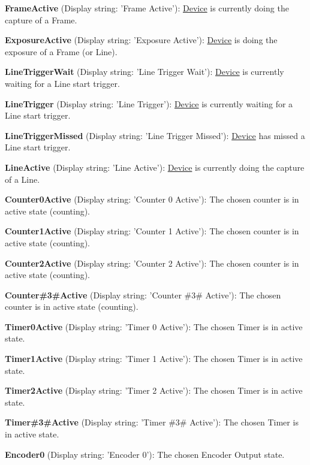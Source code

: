 \begin{DoxyItemize}
\item {\bfseries Frame\+Active} (Display string\+: 'Frame Active')\+: \hyperlink{classmv_i_m_p_a_c_t_1_1acquire_1_1_device}{Device} is currently doing the capture of a Frame.
\item {\bfseries Exposure\+Active} (Display string\+: 'Exposure Active')\+: \hyperlink{classmv_i_m_p_a_c_t_1_1acquire_1_1_device}{Device} is doing the exposure of a Frame (or Line).
\item {\bfseries Line\+Trigger\+Wait} (Display string\+: 'Line Trigger Wait')\+: \hyperlink{classmv_i_m_p_a_c_t_1_1acquire_1_1_device}{Device} is currently waiting for a Line start trigger.
\item {\bfseries Line\+Trigger} (Display string\+: 'Line Trigger')\+: \hyperlink{classmv_i_m_p_a_c_t_1_1acquire_1_1_device}{Device} is currently waiting for a Line start trigger.
\item {\bfseries Line\+Trigger\+Missed} (Display string\+: 'Line Trigger Missed')\+: \hyperlink{classmv_i_m_p_a_c_t_1_1acquire_1_1_device}{Device} has missed a Line start trigger.
\item {\bfseries Line\+Active} (Display string\+: 'Line Active')\+: \hyperlink{classmv_i_m_p_a_c_t_1_1acquire_1_1_device}{Device} is currently doing the capture of a Line.
\item {\bfseries Counter0\+Active} (Display string\+: 'Counter 0 Active')\+: The chosen counter is in active state (counting).
\item {\bfseries Counter1\+Active} (Display string\+: 'Counter 1 Active')\+: The chosen counter is in active state (counting).
\item {\bfseries Counter2\+Active} (Display string\+: 'Counter 2 Active')\+: The chosen counter is in active state (counting).
\item {\bfseries Counter\#3\#Active} (Display string\+: 'Counter \#3\# Active')\+: The chosen counter is in active state (counting).
\item {\bfseries Timer0\+Active} (Display string\+: 'Timer 0 Active')\+: The chosen Timer is in active state.
\item {\bfseries Timer1\+Active} (Display string\+: 'Timer 1 Active')\+: The chosen Timer is in active state.
\item {\bfseries Timer2\+Active} (Display string\+: 'Timer 2 Active')\+: The chosen Timer is in active state.
\item {\bfseries Timer\#3\#Active} (Display string\+: 'Timer \#3\# Active')\+: The chosen Timer is in active state.
\item {\bfseries Encoder0} (Display string\+: 'Encoder 0')\+: The chosen Encoder Output state.

\end{DoxyItemize}
